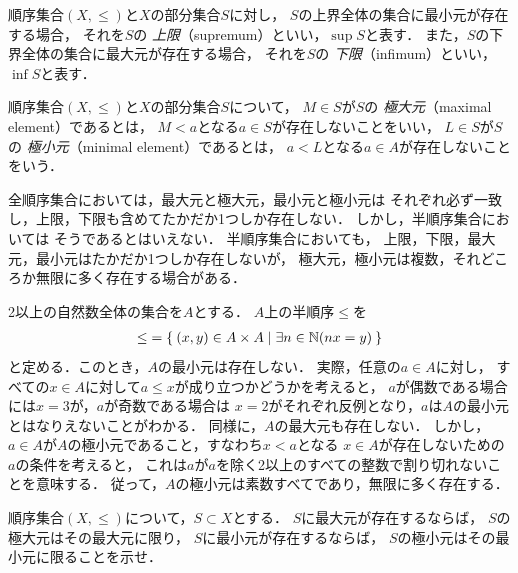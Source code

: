    順序集合$(X, {\leq})$と$X$の部分集合$S$に対し，
   $S$の上界全体の集合に最小元が存在する場合，
   それを$S$の
   \emph{上限}（supremum）といい，$\sup S$と表す．
   また，$S$の下界全体の集合に最大元が存在する場合，
   それを$S$の
   \emph{下限}（infimum）といい，$\inf S$と表す．


   順序集合$(X, {\leq})$と$X$の部分集合$S$について，
   $M \in S$が$S$の
   \emph{極大元}（maximal element）であるとは，
   $M<a$となる$a \in S$が存在しないことをいい，
   $L \in S$が$S$の
   \emph{極小元}（minimal element）であるとは，
   $a<L$となる$a \in A$が存在しないことをいう．

   全順序集合においては，最大元と極大元，最小元と極小元は
   それぞれ必ず一致し，上限，下限も含めてたかだか1つしか存在しない．
   しかし，半順序集合においては
   そうであるとはいえない．
   半順序集合においても，
   上限，下限，最大元，最小元はたかだか1つしか存在しないが，
   極大元，極小元は複数，それどころか無限に多く存在する場合がある．

   \begin{ex} \label{ex:Nkyokusyougen}
     2以上の自然数全体の集合を$A$とする．
     $A$上の半順序$\leq$を
     \begin{align*}
       {\leq} = \Set{ (x,y) \in A \times A \mid \exists n \in \mathbb{N} (nx = y) }
     \end{align*}
     と定める．このとき，$A$の最小元は存在しない．
     実際，任意の$a \in A$に対し，
     すべての$x \in A$に対して$a \leq x$が成り立つかどうかを考えると，
     $a$が偶数である場合には$x=3$が，$a$が奇数である場合は
     $x=2$がそれぞれ反例となり，$a$は$A$の最小元とはなりえないことがわかる．
     同様に，$A$の最大元も存在しない．
     しかし，$a \in A$が$A$の極小元であること，すなわち$x<a$となる
     $x \in A$が存在しないための$a$の条件を考えると，
     これは$a$が$a$を除く2以上のすべての整数で割り切れないことを意味する．
     従って，$A$の極小元は素数すべてであり，無限に多く存在する．
   \end{ex}


   \begin{que} \label{que:kyokusai}
     順序集合$(X, {\leq} )$について，$S \subset X$とする．
     $S$に最大元が存在するならば，
     $S$の極大元はその最大元に限り，
     $S$に最小元が存在するならば，
     $S$の極小元はその最小元に限ることを示せ．
   \end{que}





